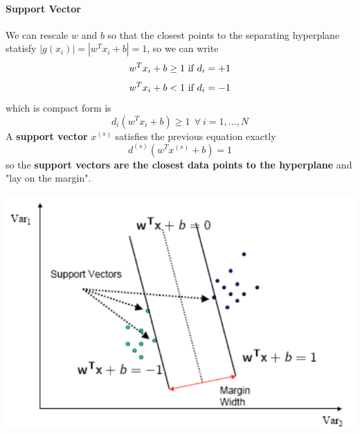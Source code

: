 \documentclass[10pt]{report}
\begin{document}
\paragraph{Support Vector} We can rescale $w$ and $b$ so that the closest points to the separating hyperplane statisfy $|g(x_i)| = |w^Tx_i + b| = 1$, so we can write $$w^Tx_i + b \geq 1\hbox{ if }d_i = +1$$ $$w^Tx_i + b < 1\hbox{ if }d_i = -1$$ which is compact form is $$d_i(w^Tx_i + b) \geq 1\:\:\forall\:i=1,\ldots,N$$
A \textbf{support vector} $x^{(s)}$ satisfies the previous equation exactly $$d^{(s)}(w^Tx^{(s)}+b) = 1$$ so the \textbf{support vectors are the closest data points to the hyperplane} and "lay on the margin".
\begin{center}
	\includegraphics[scale=0.5]{19.png}
\end{center}
\pagebreak
\end{document}
